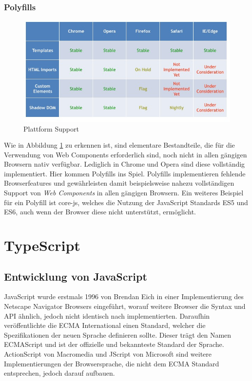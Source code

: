 \subsubsection{Polyfills}
\begin{figure}[htp]
 \centering
 \includegraphics[width=0.7\linewidth]{kapitel2/platform_support.jpg}
 \caption{Plattform Support \cite{WebCo43:online}}
 \label{fig:platform_support}
\end{figure}

\noindent Wie in Abbildung \ref{fig:platform_support} zu erkennen ist, sind elementare Bestandteile, die für die Verwendung von Web Components erforderlich sind, noch nicht in
allen gängigen Browsern nativ verfügbar. Lediglich in Chrome und Opera sind diese vollständig implementiert.
Hier kommen Polyfills ins Spiel. Polyfills implementieren fehlende Browserfeatures und gewährleisten damit beispielsweise nahezu vollständigen
Support von \emph{Web Components} in allen gängigen Browsern. Ein weiteres Beispiel für ein Polyfill ist core-js,
welches die Nutzung der JavaScript Standards \ac{ES5} und \ac{ES6}, auch wenn der Browser diese nicht unterstützt, ermöglicht.



\section{TypeScript}

\subsection{Entwicklung von JavaScript}


JavaScript wurde erstmals 1996 von Brendan Eich in einer Implementierung des Netscape Navigator Browsers eingeführt,
worauf weitere Browser die Syntax und API ähnlich, jedoch nicht identisch nach implementierten.
Daraufhin veröffentlichte die ECMA International einen Standard, welcher die Spezifikationen der neuen Sprache
definieren sollte. Dieser trägt den Namen ECMAScript und ist der offizielle und bekannteste Standard der
Sprache. ActionScript von Macromedia und JScript von Microsoft sind weitere Implementierungen der Browsersprache,
die nicht dem ECMA Standard entsprechen, jedoch darauf aufbauen.

